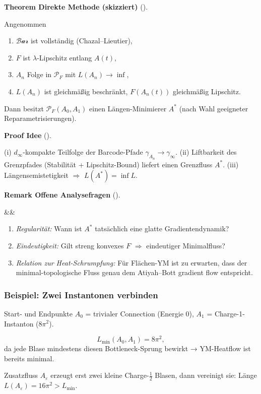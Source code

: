 \documentclass[10pt, letterpaper]{article}
\newenvironment{romanenum}[1][]
  {%
    \ifx&#1&
    \else
      \textbf{#1}\quad
    \fi
    \begin{enumerate}[label=\roman*)]
  }
  {%
    \end{enumerate}%
  }
\newcommand{\CustomHeading}[3]{%
  \par\medskip\noindent%
  \textbf{#1 #2} \textnormal{(#3)}.\enskip%
}
\newenvironment{THEO}[2]{\CustomHeading{Theorem}{#1}{#2}}{}
\newenvironment{REM}[2]{\CustomHeading{Remark}{#1}{#2}}{}
\newenvironment{PROOF}[2]{\CustomHeading{Proof}{#1}{#2}}{}
\begin{document}
\begin{THEO}{Direkte Methode (skizziert)}{}
  Angenommen
  \begin{enumerate}[label=\roman*)]
    \item $\mathcal{Bar}$ ist vollständig (Chazal–Lieutier),
    \item $F$ ist $\lambda$-Lipschitz entlang $A(t)$,
    \item $A_n$ Folge in $\mathscr P_F$ mit $L(A_n)\to \inf$,
    \item $L(A_n)$ ist gleichmäßig beschränkt,
          $F(A_n(t))$ gleichmäßig Lipschitz.
  \end{enumerate}
  Dann besitzt $\mathscr P_F(A_0,A_1)$
  einen Längen-Minimierer $A^\ast$
  (nach Wahl geeigneter Reparametrisierungen).
\end{THEO}

\begin{PROOF}{Idee}{}
  (i) $d_\infty$-kompakte Teilfolge der Barcode-Pfade  
      $\gamma_{A_n}\to\gamma_\infty$.  
  (ii) Liftbarkeit des Grenzpfades
      (Stabilität + Lipschitz-Bound) liefert
      einen Grenzfluss $A^\ast$.  
  (iii) Längensemi­stetigkeit $\Longrightarrow$
      $L(A^\ast)=\inf L$.
\end{PROOF}

\begin{REM}{Offene Analysefragen}{}
  \begin{romanenum}
    \item \emph{Regularität:} Wann ist $A^\ast$ tatsächlich eine
          glatte Gradientendynamik?
    \item \emph{Eindeutigkeit:} Gilt streng konvexes
          $F$ $\Rightarrow$ eindeutiger Minimalfluss?
    \item \emph{Relation zur Heat-Schrumpfung:}
          Für Flächen-YM ist zu erwarten,
          dass der minimal-topologische Fluss
          genau dem Atiyah–Bott gradient flow entspricht.
  \end{romanenum}
\end{REM}

\subsubsection*{Beispiel: Zwei Instantonen verbinden}

Start- und Endpunkte  
$A_0$ = trivialer Connection (Energie $0$),  
$A_1$ = Charge-1-Instanton ($8\pi^{2}$).

\[
  L_{\min}(A_0,A_1) = 8\pi^{2},
\]
da jede Blase mindestens diesen Bottleneck-Sprung bewirkt
→ YM-Heatflow ist bereits minimal.

Zusatzfluss $A_\varepsilon$
erzeugt erst zwei kleine Charge-$\tfrac12$ Blasen,
dann vereinigt sie:  
Länge $L(A_\varepsilon)=16\pi^{2}>L_{\min}$.

\end{document}
